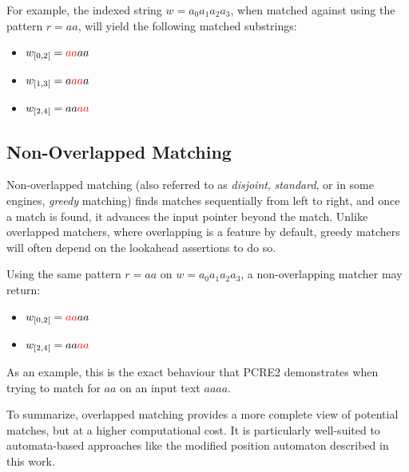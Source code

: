 For example, the indexed string $w = a_0 a_1 a_2 a_3$, when matched against using the pattern $r=aa$, will yield the following matched substrings:

\begin{itemize}
	\item $w_{[0,2[} = {\color{red}{aa}}aa$
	\item $w_{[1,3[} = a{\color{red}{aa}}a$
	\item $w_{[2,4[} = aa{\color{red}{aa}}$
\end{itemize}

\subsection*{Non-Overlapped Matching}
Non-overlapped matching (also referred to as \emph{disjoint}, \emph{standard}, or in some engines, \emph{greedy} matching) finds matches sequentially from left to right, and once a match is found, it advances the input pointer beyond the match. Unlike overlapped matchers, where overlapping is a feature by default, greedy matchers will often depend on the lookahead assertions to do so.

Using the same pattern $r=aa$ on $w = a_0 a_1 a_2 a_3$, a non-overlapping matcher may return:

\begin{itemize}
	\item $w_{[0,2[} = {\color{red}{aa}}aa$
	\item $w_{[2,4[} = aa{\color{red}{aa}}$
\end{itemize}

As an example, this is the exact behaviour that PCRE2 demonstrates when trying to match for $aa$ on an input text $aaaa$.

To summarize, overlapped matching provides a more complete view of potential matches, but at a higher computational cost. It is particularly well-suited to automata-based approaches like the modified position automaton described in this work.


